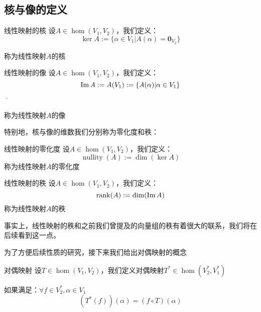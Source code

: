 \documentclass[12pt, a4paper, oneside, UTF8]{ctexbook}
\begin{document}
			\subsection{核与像的定义}
				\begin{defn}{线性映射的核}{}
					设$A \in \hom(V_1,V_2)$，我们定义：
					\begin{equation}
						\ker A := \{\alpha \in V_1 | A(\alpha )=\mathbf{0}_{V_2}\}
					\end{equation}

					称为线性映射$A$的核
				\end{defn}
				\begin{defn}{线性映射的像}{}
					设$A \in \hom(V_1,V_2)$，我们定义：
					\begin{equation}
						\operatorname{Im} A := A(V_1) := \{A(\alpha)| \alpha \in V_1\}
					\end{equation}·

					称为线性映射$A$的像
				\end{defn}
				特别地，核与像的维数我们分别称为零化度和秩：
				\begin{defn}{线性映射的零化度}{}
					设$A \in \hom(V_1,V_2)$，我们定义：
					\begin{equation}
						\operatorname{nullity} (A) := \dim(\ker A)
					\end{equation}
					称为线性映射$A$的零化度
				\end{defn}
				\begin{defn}{线性映射的秩}{}
					设$A \in \hom(V_1,V_2)$，我们定义：
					\begin{equation}
						\operatorname{rank} (A) := \dim(\operatorname{Im} A)
					\end{equation}
					称为线性映射$A$的秩
				\end{defn}
				事实上，线性映射的秩和之前我们曾提及的向量组的秩有着很大的联系，我们将在后续看到这一点。

				为了方便后续性质的研究，接下来我们给出对偶映射的概念
				\begin{defn}{对偶映射}{}
					设$T \in \hom(V_1,V_2)$，我们定义对偶映射$T^* \in \hom (V_2^*,V_1^*)$

					如果满足：$\forall f \in V_2^*,\alpha \in V_1$
					\begin{equation}
							\left(T^*(f)\right)(\alpha )=(f\circ T)(\alpha )
					\end{equation}
				\end{defn}
\end{document}
